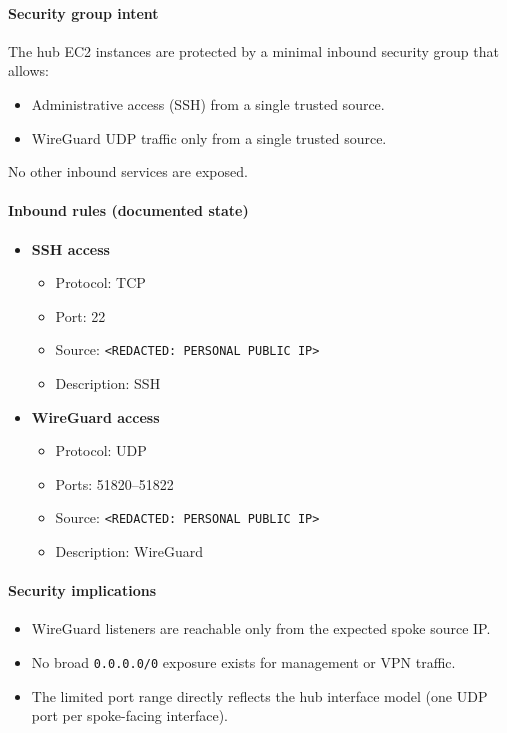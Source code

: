 \documentclass[11pt]{article}
\begin{document}
\paragraph{Security group intent}
The hub EC2 instances are protected by a minimal inbound security group that allows:
\begin{itemize}
  \item Administrative access (SSH) from a single trusted source.
  \item WireGuard UDP traffic only from a single trusted source.
\end{itemize}

No other inbound services are exposed.

\paragraph{Inbound rules (documented state)}

\begin{itemize}
  \item \textbf{SSH access}
    \begin{itemize}
      \item Protocol: TCP
      \item Port: 22
      \item Source: \texttt{<REDACTED: PERSONAL PUBLIC IP>}
      \item Description: SSH
    \end{itemize}

  \item \textbf{WireGuard access}
    \begin{itemize}
      \item Protocol: UDP
      \item Ports: 51820--51822
      \item Source: \texttt{<REDACTED: PERSONAL PUBLIC IP>}
      \item Description: WireGuard
    \end{itemize}
\end{itemize}

\paragraph{Security implications}
\begin{itemize}
  \item WireGuard listeners are reachable only from the expected spoke source IP.
  \item No broad \texttt{0.0.0.0/0} exposure exists for management or VPN traffic.
  \item The limited port range directly reflects the hub interface model (one UDP port per spoke-facing interface).
\end{itemize}
\end{document}
